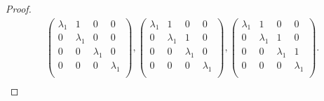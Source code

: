 \documentclass{article}
\begin{document}
\begin{proof}
\begin{align*}
        \begin{pmatrix} \lambda_1&1&0&0\\ 0&\lambda_1&0&0\\
          0&0&\lambda_1&0\\ 0&0&0&\lambda_1\\ \end{pmatrix},
        \begin{pmatrix} \lambda_1&1&0&0\\ 0&\lambda_1&1&0\\
          0&0&\lambda_1&0\\ 0&0&0&\lambda_1\\ \end{pmatrix},
        \begin{pmatrix} \lambda_1&1&0&0\\ 0&\lambda_1&1&0\\
          0&0&\lambda_1&1\\ 0&0&0&\lambda_1\\ \end{pmatrix}.\\
    \end{align*}
  \end{proof}
\end{document}

